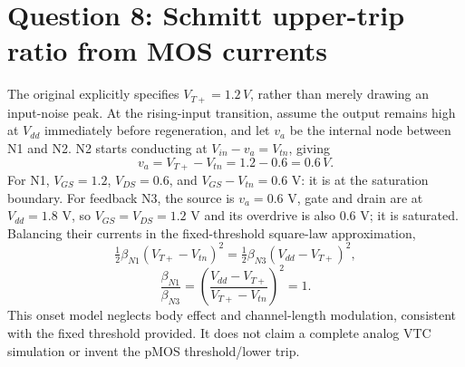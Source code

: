 \documentclass[10pt]{article}
\begin{document}
\newpage\section*{Question 8: Schmitt upper-trip ratio from MOS currents}
The original explicitly specifies $V_{T+}=1.2\,V$, rather than merely drawing an input-noise peak. At the rising-input transition, assume the output remains high at $V_{dd}$ immediately before regeneration, and let $v_a$ be the internal node between N1 and N2. N2 starts conducting at $V_{in}-v_a=V_{tn}$, giving
\[v_a=V_{T+}-V_{tn}=1.2-0.6=0.6\,V.\]
For N1, $V_{GS}=1.2$, $V_{DS}=0.6$, and $V_{GS}-V_{tn}=0.6$ V: it is at the saturation boundary. For feedback N3, the source is $v_a=0.6$ V, gate and drain are at $V_{dd}=1.8$ V, so $V_{GS}=V_{DS}=1.2$ V and its overdrive is also 0.6 V; it is saturated. Balancing their currents in the fixed-threshold square-law approximation,
\[\tfrac12\beta_{N1}(V_{T+}-V_{tn})^2=\tfrac12\beta_{N3}(V_{dd}-V_{T+})^2,\]
\[\boxed{\frac{\beta_{N1}}{\beta_{N3}}=\left(\frac{V_{dd}-V_{T+}}{V_{T+}-V_{tn}}\right)^2=1.}\]
This onset model neglects body effect and channel-length modulation, consistent with the fixed threshold provided. It does not claim a complete analog VTC simulation or invent the pMOS threshold/lower trip.
\end{document}
